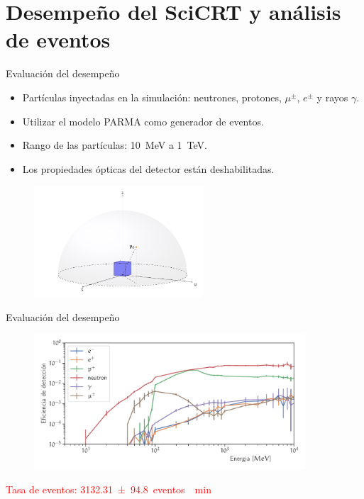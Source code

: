 \documentclass[spanish,aspectratio=169]{beamer}
\begin{document}
\section
[Desempeño del SciCRT y análisis de eventos]{Desempeño del SciCRT y análisis de eventos}
\frame{\sectionpage}

\begin{frame}{Evaluación del desempeño}

\begin{minipage}{0.45\textwidth}
  \begin{itemize}
      \item Partículas inyectadas en la simulación: neutrones, protones, $\mu^{\pm}$, $e^{\pm}$ y rayos $\gamma$.
      \item Utilizar el modelo PARMA como generador de eventos.
      \item Rango de las partículas: \SI{10}{\mega\electronvolt} a \SI{1}{\tera\electronvolt}.
      \item Los propiedades ópticas del detector están deshabilitadas.
  \end{itemize}
\end{minipage}
\begin{minipage}{0.45\textwidth}
  \begin{figure}
    \includegraphics[width=6.3cm]{sim-setup.pdf}
  \end{figure}
\end{minipage}

\end{frame}

\begin{frame}{Evaluación del desempeño}

\begin{figure}
        \centering
        \includegraphics[width=0.9\textwidth]{scibar-efficiency.pdf}
\end{figure}

\textcolor{red}{Tasa de eventos: \SI{3132.31(9480)}{eventos \per\minute}}

\end{frame}
\end{document}
